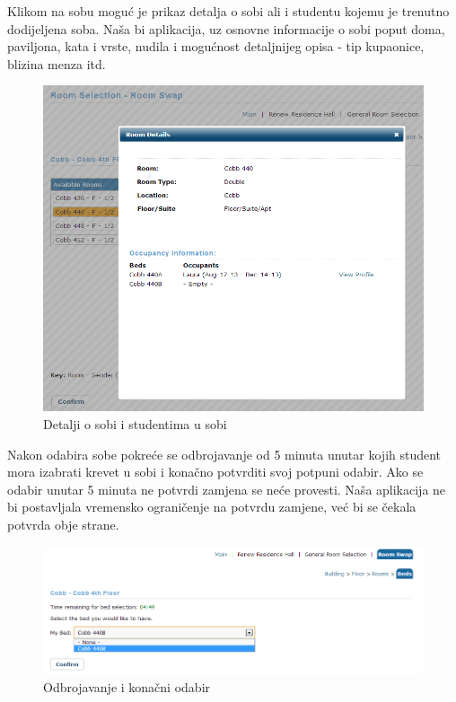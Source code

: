 		Klikom na sobu moguć je prikaz detalja o sobi ali i studentu kojemu je trenutno dodijeljena soba. Naša bi aplikacija, uz osnovne informacije o sobi poput doma, paviljona, kata i vrste, nudila i mogućnost detaljnijeg opisa - tip kupaonice, blizina menza itd. 
		
		\begin{figure}[H]
			\includegraphics[scale=0.4]{slike/rs10.png} %
			\centering
			\caption{Detalji o sobi i studentima u sobi}
			\label{fig:promjene3}
		\end{figure}
	
		Nakon odabira sobe pokreće se odbrojavanje od 5 minuta unutar kojih student mora izabrati krevet u sobi i konačno potvrditi svoj potpuni odabir. Ako se odabir unutar 5 minuta ne potvrdi zamjena se neće provesti. Naša aplikacija ne bi postavljala vremensko ograničenje na potvrdu zamjene, već bi se čekala potvrda obje strane.
		
		\begin{figure}[H]
			\includegraphics[scale=0.5]{slike/rs11.png} %
			\centering
			\caption{Odbrojavanje i konačni odabir}
			\label{fig:promjene4}
		\end{figure}
	
		\clearpage
		
		
		
		\eject
		
	